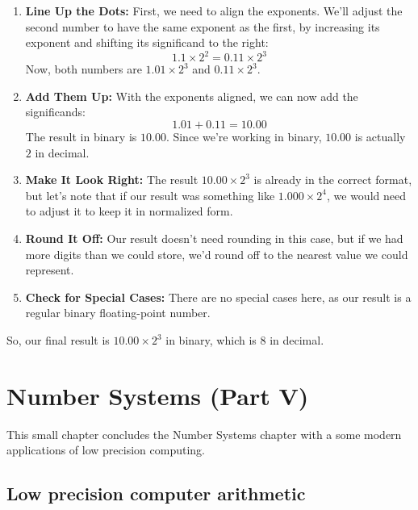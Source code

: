 \documentclass[12pt,openany, tikz,border=10pt]{book}
\begin{document}
\begin{enumerate}
    \item \textbf{Line Up the Dots:} First, we need to align the exponents. We'll adjust the second number to have the same exponent as the first, by increasing its exponent and shifting its significand to the right: 
    \[
    1.1 \times 2^2 = 0.11 \times 2^3
    \]
    Now, both numbers are $1.01 \times 2^3$ and $0.11 \times 2^3$.

    \item \textbf{Add Them Up:} With the exponents aligned, we can now add the significands:
    \[
    1.01 + 0.11 = 10.00
    \]
    The result in binary is $10.00$. Since we're working in binary, $10.00$ is actually $2$ in decimal. 

    \item \textbf{Make It Look Right:} The result $10.00 \times 2^3$ is already in the correct format, but let's note that if our result was something like $1.000 \times 2^4$, we would need to adjust it to keep it in normalized form.

    \item \textbf{Round It Off:} Our result doesn't need rounding in this case, but if we had more digits than we could store, we'd round off to the nearest value we could represent.

    \item \textbf{Check for Special Cases:} There are no special cases here, as our result is a regular binary floating-point number.
\end{enumerate}

So, our final result is $10.00 \times 2^3$ in binary, which is $8$ in decimal.


\chapter{Number Systems (Part V)}




\begin{text}
    This small chapter concludes the Number Systems chapter with a some modern applications of low precision computing.
\end{text}
\section{Low precision computer arithmetic}
\end{document}
